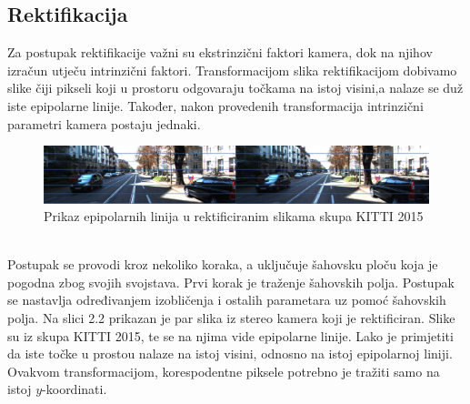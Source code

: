 \documentclass[times, utf8, zavrsni, numeric]{fer}
\begin{document}
\subsection{Rektifikacija}
Za postupak rektifikacije važni su ekstrinzični faktori kamera, dok na njihov izračun utječu intrinzični faktori. Transformacijom slika rektifikacijom dobivamo slike čiji pikseli koji u prostoru odgovaraju točkama na istoj visini,a nalaze se duž iste epipolarne linije. Također, nakon provedenih transformacija intrinzični parametri kamera postaju jednaki.\\
\begin{figure}[htb]
\centering
\includegraphics[width = 14.5cm]{img/slika3.png}
\caption{Prikaz epipolarnih linija u rektificiranim slikama skupa KITTI 2015}
\label{fig:Radial}
\end{figure}\\
Postupak se provodi kroz nekoliko koraka, a uključuje šahovsku ploču koja je pogodna zbog svojih svojstava. Prvi korak je traženje šahovskih polja. Postupak se nastavlja određivanjem izobličenja i ostalih parametara uz pomoć šahovskih polja.
Na slici 2.2 prikazan je par slika iz stereo kamera koji je rektificiran. Slike su iz skupa KITTI 2015, te se na njima vide epipolarne linije. Lako je primjetiti da iste točke u prostou nalaze na istoj visini, odnosno na istoj epipolarnoj liniji. Ovakvom transformacijom, korespodentne piksele potrebno je tražiti samo na istoj $y$-koordinati.
\end{document}
